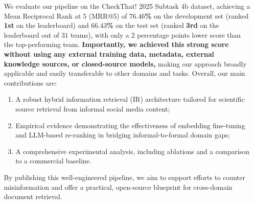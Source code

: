 We evaluate our pipeline on the CheckThat! 2025 Subtask 4b dataset, achieving a Mean Reciprocal Rank at $5$ (MRR@5) of \textbf{$76.46$\%} on the development set (ranked \textbf{1st} on the leaderboard) and \textbf{$66.43$\%} on the test set (ranked \textbf{3rd} on the leaderboard out of $31$ teams), with only a $2$ percentage points lower score than the top-performing team.
\textbf{Importantly, we achieved this strong score without using any external training data, metadata, external knowledge sources, or closed-source models,} making our approach broadly applicable and easily transferable to other domains and tasks.
Overall, our main contributions are:
%
\begin{enumerate}
    \item A robust hybrid information retrieval (IR) architecture tailored for scientific source retrieval from informal social media content;
    \item Empirical evidence demonstrating the effectiveness of embedding fine-tuning and LLM-based re-ranking in bridging informal-to-formal domain gaps;
    \item A comprehensive experimental analysis, including ablations and a comparison to a commercial baseline.
\end{enumerate}
%
By publishing this well-engineered pipeline, we aim to support efforts to counter misinformation and offer a practical, open-source blueprint for cross-domain document retrieval.